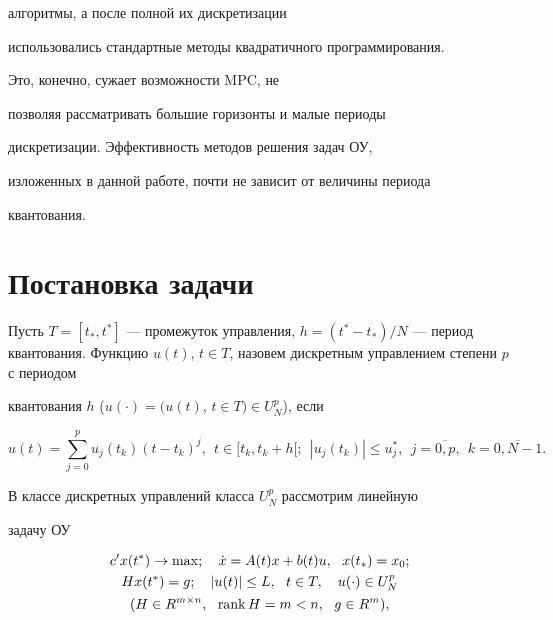 алгоритмы, а после полной их дискретизации


использовались стандартные методы квадратичного программирования.


Это, конечно, сужает возможности MPC, не


позволяя рассматривать большие горизонты и малые периоды


дискретизации. Эффективность методов решения задач ОУ,


изложенных в данной работе, почти не зависит от величины периода


квантования.








\section{Постановка задачи}





Пусть $T = [t_*, t^*]$ --- промежуток управления, $h = (t^*-


t_*)/N$ --- период квантования. Функцию $u(t)$, $t


\in T$, назовем дискретным управлением степени $p$ с периодом


квантования $h$ ($u(\cdot) = (u(t)$, $t \in T) \in


U_N^p$), если


\begin{equation}\label{control}


u(t) = \sum\limits_{j=0}^{p} u_j(t_k) (t-t_k)^j, \ \ t \in [t_k, t_k


+ h[; \ \ |u_j(t_k)| \leq u_j^*, \ \ j =


\overline{0,p}, \ \ k = \overline{0,N-1}.


\end{equation}





В классе дискретных управлений класса $U_N^p$ рассмотрим линейную


задачу ОУ


\begin{gather}


c'x(t^*) \to \max; \quad \Dot x = A(t)x + b(t)u, \ \ x(t_*) = x_{0};\notag\\


%


\label{problem}


Hx(t^*) = g; \quad |u(t)| \leq L, \ \ t \in T, \quad u(\cdot) \in


U_N^p \\


%


(H \in R^{m \times n}, \ \ \rank H = m < n, \ \ g \in R^m),\notag


\end{gather}



